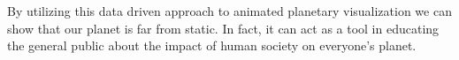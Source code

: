 \documentclass[journal]{vgtc}                %
\newcommand{\fig}[1]{Figure~\ref{fig:#1}}
\begin{document}
By utilizing this data driven approach to animated planetary visualization we can show that our planet is far from static. In fact, it can act as a tool in educating the general public about the impact of human society on everyone's planet.





\iffalse
\end{document}
